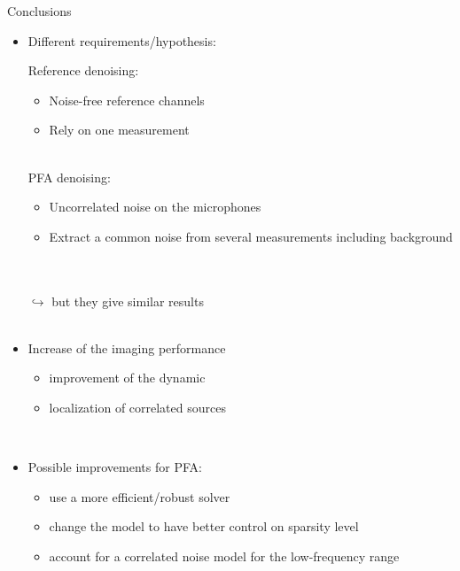 \documentclass[10pt,xcolor=x11names,compress, show notes]{beamer}%
\begin{document}
\begin{frame}{Conclusions}
\begin{itemize}
	\item Different requirements/hypothesis:\\[-3ex]
	\hspace{-0.8cm}\begin{minipage}[t]{0.43\textwidth}
		\begin{block}{Reference denoising: }
			\begin{itemize}
       				 \item Noise-free reference channels
       			 	 \item Rely on one measurement\\~
			\end{itemize}
		\end{block}
	\end{minipage}
	\hfill
	\begin{minipage}[t]{0.55\textwidth}
		\begin{block}{PFA denoising:}
			\begin{itemize}
				\item Uncorrelated noise on the microphones
	       			 \item Extract a common noise from several measurements including background 
			\end{itemize}
		\end{block}
	\end{minipage}\\
	~\\[1ex]	
	$\hookrightarrow$ but they give similar results\\~\\
        \item Increase of the imaging performance
        \begin{itemize}
       		 \item improvement of the dynamic
        		\item localization of correlated sources
	\end{itemize}~\\
	
	\item Possible improvements for PFA:
	\begin{itemize}
        		\item use a more efficient/robust solver
        		\item change the model to have better control on sparsity level%
        		\item account for a correlated noise model for the low-frequency range%
	\end{itemize}
\end{itemize}


\end{frame}
\end{document}
